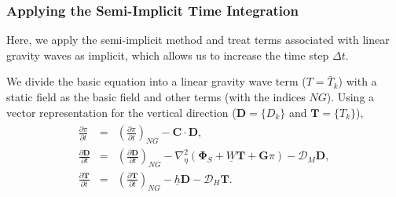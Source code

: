 \hypertarget{applying-the-semi-implicit-time-integration}{%
\subsubsection{Applying the Semi-Implicit Time Integration}\label{applying-the-semi-implicit-time-integration}}

Here, we apply the semi-implicit method and treat terms associated with linear gravity waves as implicit, which allows us to increase the time step \(\Delta t\).

We divide the basic equation into a linear gravity wave term (\(T=\bar{T}_k\)) with a static field as the basic field and other terms (with the indices \(NG\)). Using a vector representation for the
vertical direction (\({\mathbf{D}}=\{ D_{k} \}\) and \({\mathbf{T}}=\{ T_{k} \}\)), \begin{eqnarray}\begin{aligned}
   \frac{\partial \pi}{\partial t} &=&
          \left( \frac{\partial \pi}{\partial t} \right)_{NG}
     - {\mathbf{C}} \cdot {\mathbf{D}}, \\
  \frac{\partial {\mathbf{D}}}{\partial t} &=&
          \left( \frac{\partial {\mathbf{D}}}{\partial t} \right)_{NG}
          - \nabla^{2}_{\eta} ( {\mathbf{\Phi}}_{S}
                                  + \underline{W} {\mathbf{T}}
                                  + {\mathbf{G}} \pi )
          - {\mathcal D}_M {\mathbf{D}} , \\
  \frac{\partial {\mathbf{T}}}{\partial t}
      &=&   \left( \frac{\partial {\mathbf{T}}}
                        {\partial t}       \right)_{NG}
         - \underline{h} {\mathbf{D}}
         - {\mathcal D}_H {\mathbf{T}}.\end{aligned}\end{eqnarray}

